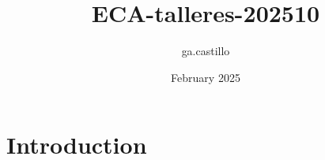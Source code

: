 \documentclass{article}
\title{ECA-talleres-202510}
\author{ga.castillo }
\date{February 2025}
\begin{document}
\maketitle

\section{Introduction}
\end{document}
